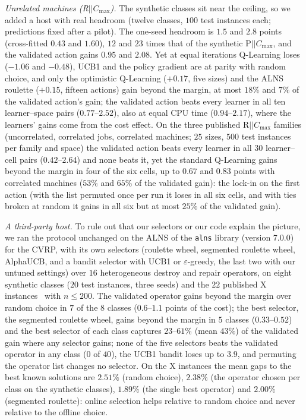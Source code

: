 \documentclass[conference,a4paper]{IEEEtran}
\newcommand{\Cmax}{C_{\max}}
\begin{document}
\emph{Unrelated machines (R$||\Cmax$).} The synthetic classes sit near the ceiling, so we added a host with real headroom (twelve classes, $100$ test instances each; predictions fixed after a pilot). The one-seed headroom is $1.5$ and $2.8$ points (cross-fitted $0.43$ and $1.60$), $12$ and $23$ times that of the synthetic P$||\Cmax$, and the validated action gains $0.95$ and $2.08$.
Yet at equal iterations Q-Learning loses ($-1.06$ and $-0.48$), UCB1 and the policy gradient are at parity with random choice, and only the optimistic Q-Learning ($+0.17$, five sizes) and the ALNS roulette ($+0.15$, fifteen actions) gain beyond the margin, at most $18\%$ and $7\%$ of the validated action's gain; the validated action beats every learner in all ten learner--space pairs ($0.77$--$2.52$), also at equal CPU time ($0.94$--$2.17$), where the learners' gains come from the cost effect.
On the three published R$||\Cmax$ families (uncorrelated, correlated jobs, correlated machines; $25$ sizes, $500$ test instances per family and space) the validated action beats every learner in all $30$ learner--cell pairs ($0.42$--$2.64$) and none beats it, yet the standard Q-Learning gains beyond the margin in four of the six cells, up to $0.67$ and $0.83$ points with correlated machines ($53\%$ and $65\%$ of the validated gain): the lock-in on the first action (with the list permuted once per run it loses in all six cells, and with ties broken at random it gains in all six but at most $25\%$ of the validated gain).



\emph{A third-party host.} To rule out that our selectors or our code explain the picture, we ran the protocol unchanged on the ALNS of the \texttt{alns} library (version 7.0.0)~\cite{WoudaLan2023} for the CVRP, with its own selectors (roulette wheel, segmented roulette wheel, AlphaUCB, and a bandit selector with UCB1 or $\varepsilon$-greedy, the last two with our untuned settings) over $16$ heterogeneous destroy and repair operators, on eight synthetic classes ($20$ test instances, three seeds) and the $22$ published X instances~\cite{UchoaEtal2017} with $n\le200$.
The validated operator gains beyond the margin over random choice in $7$ of the $8$ classes ($0.6$--$1.1$ points of the cost); the best selector, the segmented roulette wheel, gains beyond the margin in $5$ classes ($0.33$--$0.52$) and the best selector of each class captures $23$--$61\%$ (mean $43\%$) of the validated gain where any selector gains; none of the five selectors beats the validated operator in any class ($0$ of $40$), the UCB1 bandit loses up to $3.9$, and permuting the operator list changes no selector.
On the X instances the mean gaps to the best known solutions are $2.51\%$ (random choice), $2.38\%$ (the operator chosen per class on the synthetic classes), $1.89\%$ (the single best operator) and $2.00\%$ (segmented roulette): online selection helps relative to random choice and never relative to the offline choice.
\end{document}
